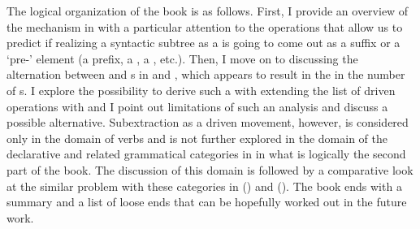 The logical organization of the book is as follows. First, I provide an overview of the  mechanism in  with a particular attention to the operations that allow us to predict if realizing a syntactic subtree as a  is going to come out as a suffix or a `pre-' element (a prefix, a , a , etc.). Then, I move on to discussing the alternation between  and  s in  and , which appears to result in the  in the number of s. I explore the possibility to derive such a  with extending the list of  driven operations with  and I point out limitations of such an analysis and discuss a possible alternative.  Subextraction as a  driven movement, however, is considered  only in the domain of  verbs  and is not further explored in the domain of the declarative  and related grammatical categories in  in what is logically the second part of the book. The discussion of this domain is followed by a comparative look at the similar problem with these categories in  () and  (). The book ends with a summary and a list of loose ends that can be hopefully worked out in the future work.




















